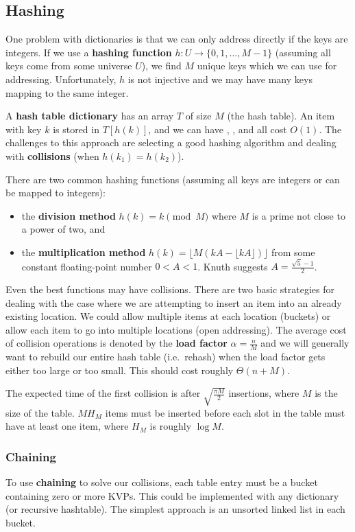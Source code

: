 \documentclass[12pt]{article}
\begin{document}
\subsection{Hashing}
One problem with dictionaries is that we can only address directly if the keys are integers. If we use a {\bf hashing function} $h: U \to \{0, 1, \dots, M-1\}$ (assuming all keys come from some universe $U$), we find $M$ unique keys which we can use for addressing. Unfortunately, $h$ is not injective and we may have many keys mapping to the same integer.

A {\bf hash table dictionary} has an array $T$ of size $M$ (the hash table). An item with key $k$ is stored in $T[h(k)]$, and we can have , , and  all cost $O(1)$. The challenges to this approach are selecting a good hashing algorithm and dealing with {\bf collisions} (when $h(k_1) = h(k_2)$).

There are two common hashing functions (assuming all keys are integers or can be mapped to integers):
\begin{itemize}
\item the {\bf division method} $h(k) = k \pmod M$ where $M$ is a prime not close to a power of two, and
\item the {\bf multiplication method} $h(k) = \lfloor M(kA - \lfloor kA \rfloor)\rfloor$ from some constant floating-point number $0 < A < 1$. Knuth suggests $A = \frac{\sqrt{5} - 1}{2}$.
\end{itemize}

Even the best functions may have collisions. There are two basic strategies for dealing with the case where we are attempting to insert an item into an already existing location. We could allow multiple items at each location (buckets) or allow each item to go into multiple locations (open addressing). The average cost of collision operations is denoted by the {\bf load factor} $\alpha = \frac{n}{M}$ and we will generally want to rebuild our entire hash table (i.e.\ rehash) when the load factor gets either too large or too small. This should cost roughly $\Theta(n + M)$.

The expected time of the first collision is after $\sqrt{\frac{\pi M}{2}}$ insertions, where $M$ is the size of the table. $M H_M$ items must be inserted before each slot in the table must have at least one item, where $H_M$ is roughly $\log M$.

\subsubsection{Chaining}
To use {\bf chaining} to solve our collisions, each table entry must be a bucket containing zero or more KVPs. This could be implemented with any dictionary (or recursive hashtable). The simplest approach is an unsorted linked list in each bucket.
\end{document}
